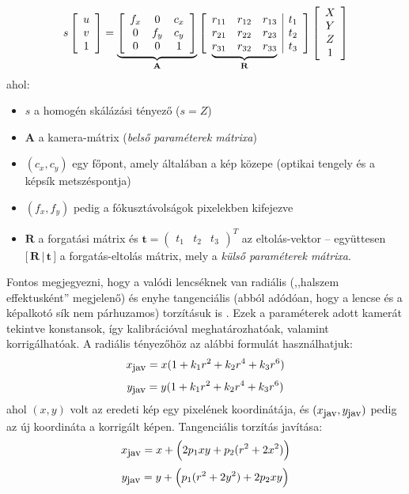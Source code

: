\documentclass[a4paper,oneside]{article}
\newcommand\undermat[2]{%
  \makebox[0pt][l]{$\smash{\underbrace{\phantom{%
    \begin{matrix}#2\end{matrix}}}_{\text{$#1$}}}$}#2}
\begin{document}
\[s \left[\begin{array}{c}
u \\ 
v \\
1
\end{array}\right] = \underbrace{\left[\begin{array}{ccc}
f_x & 0 & c_x \\ 
0 & f_y & c_y \\
0 & 0 & 1
\end{array}\right]}_{\mathbf{A}} \left[\begin{array}{ccc|c}
r_{11} & r_{12} & r_{13} & t_1 \\ 
r_{21} & r_{22} & r_{23} & t_2 \\
\undermat{\mathbf{R}}{r_{31} & r_{32} & r_{33}} & t_3 \\
\end{array}\right] \left[\begin{array}{c}
X \\ 
Y \\
Z \\
1
\end{array}\right]\]
ahol:
\begin{itemize}[itemsep=0pt]
\item $s$ a homogén skálázási tényező ($s = Z$)
\item $\mathbf{A}$ a kamera-mátrix (\textit{belső paraméterek mátrixa})
\item $(c_x, c_y)$ egy főpont, amely általában a kép közepe (optikai tengely és a képsík metszéspontja)
\item $(f_x, f_y)$ pedig a fókusztávolságok pixelekben kifejezve
\item $\mathbf{R}$ a forgatási mátrix és $\mathbf{t} = \left(\begin{array}{ccc}t_1 & t_2 & t_3\end{array}\right)^T$ az eltolás-vektor -- együttesen $\Big[\,\mathbf{R}\,|\,\mathbf{t}\,\Big]$ a forgatás-eltolás mátrix, mely a \textit{külső paraméterek mátrixa}.
\end{itemize}

Fontos megjegyezni, hogy a valódi lencséknek van radiális (,,halszem effektusként'' megjelenő) és enyhe tangenciális (abból adódóan, hogy a lencse és a képalkotó sík nem párhuzamos) torzításuk is \cite{camera-calib}. Ezek a paraméterek adott kamerát tekintve konstansok, így kalibrációval meghatározhatóak, valamint korrigálhatóak.
A radiális tényezőhöz az alábbi formulát használhatjuk:
\[x_{\hbox{\small jav}} = x(1 + k_1r^2 + k_2r^4 + k_3r^6)\]
\[y_{\hbox{\small jav}} = y(1 + k_1r^2 + k_2r^4 + k_3r^6)\]
ahol $(x,y)$ volt az eredeti kép egy pixelének koordinátája, és $(x_{\hbox{\small jav}}, y_{\hbox{\small jav}})$ pedig az új koordináta a korrigált képen.
Tangenciális torzítás javítása:
\[x_{\hbox{\small jav}} = x + \Big(2p_1xy + p_2(r^2+2x^2)\Big)\]
\[y_{\hbox{\small jav}} = y + \Big(p_1(r^2+2y^2) + 2p_2xy\Big)\]
\end{document}
